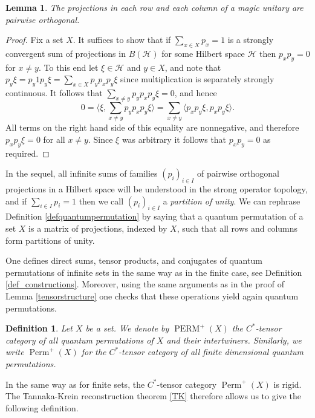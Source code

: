 \documentclass[a4paper]{amsart}
\newcommand*{\Hc}{\mathcal{H}}
\newcommand*{\ket}{\rangle}
\newcommand*{\bra}{\langle}
\DeclareMathOperator{\Perm}{Perm}
\DeclareMathOperator{\PERM}{PERM}
\numberwithin{equation}{section}
\theoremstyle{change}
\newtheorem{lemma}[theorem]{Lemma}
\newtheorem{definition}[theorem]{Definition}
\begin{document}
\begin{lemma} \label{orthogonality}
The projections in each row and each column of a magic unitary are pairwise orthogonal. 
\end{lemma}  

\begin{proof} 
Fix a set $ X $. It suffices to show that if $ \sum_{x \in X} p_x = 1 $ is a strongly convergent sum of projections in $ B(\Hc) $ for some Hilbert space $ \Hc $ then $ p_x p_y = 0 $ for $ x \neq y $. 
To this end let $ \xi \in \Hc $ and $ y \in X $, and note that $ p_y \xi = p_y 1 p_y \xi = \sum_{x \in X} p_y p_x p_y \xi $ since multiplication is separately strongly continuous. 
It follows that $ \sum_{x \neq y} p_y p_x p_y \xi = 0 $, and hence  
$$
0 = \bra \xi, \sum_{x \neq y} p_y p_x p_y \xi \ket = \sum_{x \neq y} \bra p_x p_y \xi, p_x p_y \xi \ket. 
$$ 
All terms on the right hand side of this equality are nonnegative, and therefore $ p_x p_y \xi = 0 $ for all $ x \neq y $. Since $ \xi $ was arbitrary 
it follows that $ p_x p_y = 0 $ as required.
\end{proof} 

In the sequel, all infinite sums of families $ (p_i)_{i \in I} $ of pairwise orthogonal projections in a Hilbert space will be understood in the strong operator topology, 
and if $ \sum_{i \in I} p_i = 1 $ then we call $ (p_i)_{i \in I} $ a \emph{partition of unity}. We can rephrase Definition \ref{defquantumpermutation} 
by saying that a quantum permutation of a set $ X $ is a matrix of projections, indexed by $ X $, such that all rows and columns form partitions of unity. 

One defines direct sums, tensor products, and conjugates of quantum permutations of infinite sets in the same way as in the finite case, see Definition \ref{def_constructions}. 
Moreover, using the same arguments as in the proof of Lemma \ref{tensorstructure} one checks that these operations yield again quantum permutations. 

\begin{definition} 
Let $ X $ be a set. We denote by $ \PERM^+(X) $ the $ C^* $-tensor category of all quantum permutations of $ X $ and their intertwiners. Similarly, we write $ \Perm^+(X) $ for the $ C^* $-tensor category of all finite dimensional quantum permutations. 
\end{definition} 

In the same way as for finite sets, the $ C^* $-tensor category $ \Perm^+(X) $ is rigid. The Tannaka-Krein reconstruction theorem \ref{TK} 
therefore allows us to give the following definition. 
\end{document}
